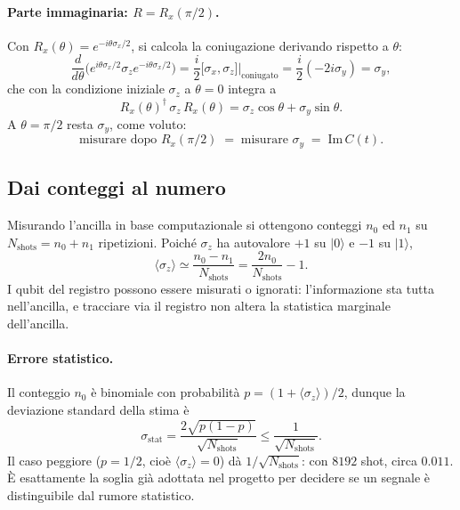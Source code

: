 \documentclass[11pt,a4paper]{article}
\begin{document}
\paragraph{Parte immaginaria: $R=R_x(\pi/2)$.} Con $R_x(\theta)=e^{-i\theta\sigma_x/2}$,
si calcola la coniugazione derivando rispetto a $\theta$:
\begin{equation}
\frac{d}{d\theta}\Big(e^{i\theta\sigma_x/2}\sigma_z e^{-i\theta\sigma_x/2}\Big)
=\frac{i}{2}\big[\sigma_x,\sigma_z\big]\Big|_{\text{coniugato}}
=\frac{i}{2}(-2i\sigma_y)=\sigma_y ,
\end{equation}
che con la condizione iniziale $\sigma_z$ a $\theta=0$ integra a
\begin{equation}
R_x(\theta)^\dagger\,\sigma_z\,R_x(\theta)=\sigma_z\cos\theta+\sigma_y\sin\theta .
\end{equation}
A $\theta=\pi/2$ resta $\sigma_y$, come voluto:
\begin{equation}
\text{misurare dopo }R_x(\pi/2)\;=\;\text{misurare }\sigma_y\;=\;\mathrm{Im}\,C(t).
\end{equation}

\subsection{Dai conteggi al numero}

Misurando l'ancilla in base computazionale si ottengono conteggi $n_0$ ed $n_1$ su
$N_{\text{shots}}=n_0+n_1$ ripetizioni. Poiché $\sigma_z$ ha autovalore $+1$ su $|0\rangle$ e
$-1$ su $|1\rangle$,
\begin{equation}
\langle\sigma_z\rangle\simeq\frac{n_0-n_1}{N_{\text{shots}}}=\frac{2n_0}{N_{\text{shots}}}-1 .
\end{equation}
I qubit del registro possono essere misurati o ignorati: l'informazione sta tutta nell'ancilla,
e tracciare via il registro non altera la statistica marginale dell'ancilla.

\paragraph{Errore statistico.} Il conteggio $n_0$ è binomiale con probabilità
$p=(1+\langle\sigma_z\rangle)/2$, dunque la deviazione standard della stima è
\begin{equation}
\sigma_{\text{stat}}=\frac{2\sqrt{p(1-p)}}{\sqrt{N_{\text{shots}}}}\le\frac{1}{\sqrt{N_{\text{shots}}}} .
\end{equation}
Il caso peggiore ($p=1/2$, cioè $\langle\sigma_z\rangle=0$) dà $1/\sqrt{N_{\text{shots}}}$: con
$8192$ shot, circa $0.011$. È esattamente la soglia già adottata nel progetto per decidere se
un segnale è distinguibile dal rumore statistico.
\end{document}
